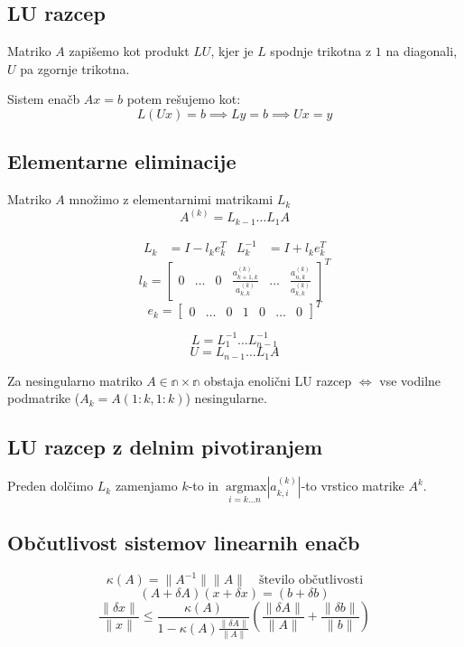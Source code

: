 \begin{multicols}{4}
\section{LU razcep}
Matriko $A$ zapišemo kot produkt $LU$, kjer je $L$ spodnje trikotna z $1$ na diagonali, $U$ pa zgornje trikotna.

Sistem enačb $Ax = b$ potem rešujemo kot:
\[L(Ux) = b \implies Ly = b \implies Ux = y\]

\subsection{Elementarne eliminacije}
Matriko $A$ množimo z elementarnimi matrikami $L_k$
\[ A^{(k)} = L_{k-1} \dots L_1 A\]

\begin{align*}
	L_k &= I - l_k e_k^T & L_k^{-1} &= I + l_k e_k^T
\end{align*}
\[ l_k = \begin{bmatrix}
	0 &
	\dots &
	0 &
	\frac{a^{(k)}_{k+1, k}}{a^{(k)}_{k, k}} &
	\dots &
	\frac{a^{(k)}_{n, k}}{a^{(k)}_{k, k}}
\end{bmatrix}^T \]
\[ e_k = \begin{bmatrix}
	0 &
	\dots &
	0 &
	1 &
	0 &
	\dots &
	0
\end{bmatrix}^T \]

\[L = L_1^{-1} \dots L_{n-1}^{-1}\]
\[U = L_{n-1} \dots L_1 A\]

Za nesingularno matriko $A \in \mathbb{n\times n}$ obstaja enolični LU razcep $\iff$ vse vodilne podmatrike ($A_k = A(1:k, 1:k)$) nesingularne.

\subsection{LU razcep z delnim pivotiranjem}
Preden dolčimo $L_k$ zamenjamo $k$-to in $\underset{i=k \dots n}{\ \mathrm{argmax}} |a^{(k)}_{k,i}|$-to vrstico matrike $A^{k}$.

\subsection{Občutlivost sistemov linearnih enačb}
\[ \kappa(A) = \| A^{-1} \| \| A \| \quad \text{število občutlivosti}\]
\[ (A + \delta A)(x + \delta x) = (b + \delta b)\]
\[ \frac{\| \delta x \| }{\| x \|} \leq \frac{\kappa(A)}{1-\kappa(A) \frac{\| \delta A \|}{\| A \|}} \left( \frac{\| \delta A \|}{\| A \|} + \frac{\| \delta b \|}{\| b \|} \right)\]


\end{multicols}
